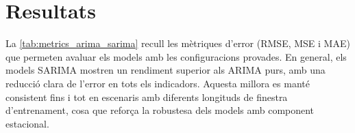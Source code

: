 \documentclass[../main.tex]{subfiles}
\begin{document}
\begin{table}[H]
    \centering
    \small
    \caption{Configuracions experimentals dels models ARIMA i SARIMA amb tots els paràmetres considerats. Es mostren tant les estratègies de predicció directa com les de \textit{rolling forecast}.}
    \label{tab:config_experiments_arima_completa}
\end{table}


\section{Resultats}

La \cref{tab:metrics_arima_sarima} recull les mètriques d’error (RMSE, MSE i MAE) que permeten avaluar els models amb les configuracions provades. En general, els models SARIMA mostren un rendiment superior als ARIMA purs, amb una reducció clara de l’error en tots els indicadors. Aquesta millora es manté consistent fins i tot en escenaris amb diferents longituds de finestra d’entrenament, cosa que reforça la robustesa dels models amb component estacional.
\end{document}
